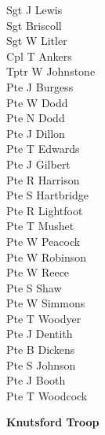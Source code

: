 \begin{multicols}{2}
  \noindent
  Sgt J Lewis \\
  Sgt Briscoll \\
  Sgt W Litler \\
  Cpl T Ankers \\
  Tptr W Johnstone \\
  Pte J Burgess \\
  Pte W Dodd \\
  Pte N Dodd \\
  Pte J Dillon \\
  Pte T Edwards \\
  Pte J Gilbert \\
  Pte R Harrison \\
  Pte S Hartbridge \\
  Pte R Lightfoot \\
  Pte T Mushet \\
  Pte W Peacock \\
  Pte W Robinson \\
  Pte W Reece \\
  Pte S Shaw \\
  Pte W Simmons \\
  Pte T Woodyer \\
  Pte J Dentith \\
  Pte B Dickens \\
  Pte S Johnson \\
  Pte J Booth \\
  Pte T Woodcock \\
\end{multicols}

\begin{center}
  \Large
  \textbf{Knutsford Troop}
\end{center}

